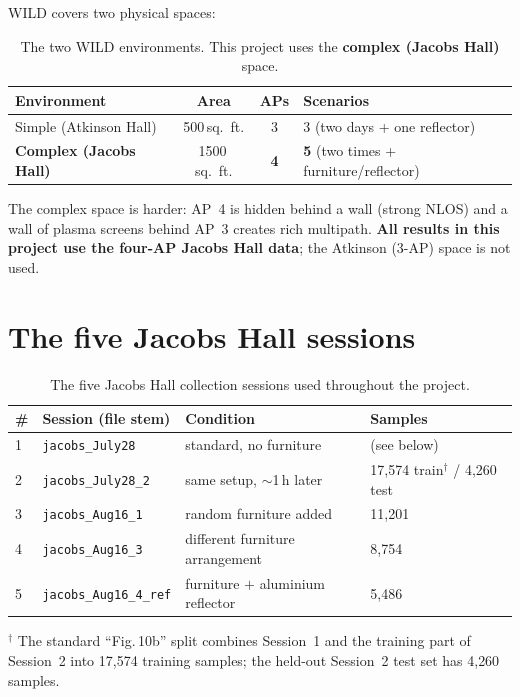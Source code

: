 \documentclass[11pt,a4paper]{article}
\begin{document}
WILD covers two physical spaces:

\begin{table}[h]
\centering
\caption{The two WILD environments. This project uses the \textbf{complex (Jacobs Hall)} space.}
\begin{tabular}{@{}lccl@{}}
\toprule
Environment & Area & APs & Scenarios \\
\midrule
Simple (Atkinson Hall)  & 500\,sq.\ ft.  & 3 & 3 (two days + one reflector) \\
\textbf{Complex (Jacobs Hall)} & 1500\,sq.\ ft. & \textbf{4} & \textbf{5} (two times + furniture/reflector) \\
\bottomrule
\end{tabular}
\end{table}

The complex space is harder: AP~4 is hidden behind a wall (strong NLOS) and a wall of plasma
screens behind AP~3 creates rich multipath. \textbf{All results in this project use the four-AP
Jacobs Hall data}; the Atkinson (3-AP) space is not used.

\section{The five Jacobs Hall sessions}

\begin{table}[h]
\centering
\caption{The five Jacobs Hall collection sessions used throughout the project.}
\label{tab:sessions}
\begin{tabular}{@{}llll@{}}
\toprule
\# & Session (file stem) & Condition & Samples \\
\midrule
1 & \texttt{jacobs\_July28}        & standard, no furniture            & (see below) \\
2 & \texttt{jacobs\_July28\_2}     & same setup, $\sim$1\,h later      & 17{,}574 train$^\dagger$ / 4{,}260 test \\
3 & \texttt{jacobs\_Aug16\_1}      & random furniture added            & 11{,}201 \\
4 & \texttt{jacobs\_Aug16\_3}      & different furniture arrangement   & 8{,}754 \\
5 & \texttt{jacobs\_Aug16\_4\_ref} & furniture $+$ aluminium reflector & 5{,}486 \\
\bottomrule
\end{tabular}
\end{table}
{\footnotesize $^\dagger$ The standard ``Fig.\,10b'' split combines Session~1 and the training
part of Session~2 into 17{,}574 training samples; the held-out Session~2 test set has 4{,}260
samples.}
\end{document}
